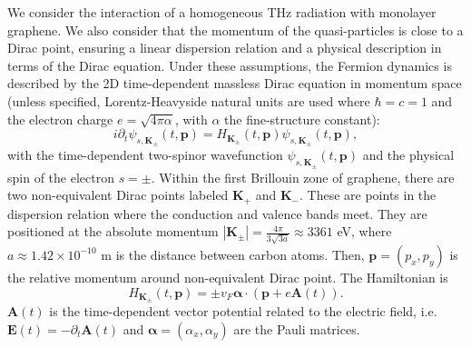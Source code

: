 \documentclass[9pt,twocolumn,twoside]{osajnl}
\begin{document}
We consider the interaction of a homogeneous THz radiation with monolayer graphene. %
We also consider that the momentum of the quasi-particles is close to a Dirac point, ensuring a linear dispersion relation and a physical description in terms of the Dirac equation. 
Under these assumptions, the Fermion dynamics is described by the 2D time-dependent massless Dirac equation in momentum space (unless specified, Lorentz-Heavyside natural units are used where $\hbar=c=1$ and the electron charge $e=\sqrt{4\pi\alpha}$, with $\alpha$ the fine-structure constant): %
\begin{equation}\label{eq_Dirac}
i\partial_t \psi_{s,\textbf{K}_{\pm}}(t,\textbf{p}) = H_{\textbf{K}_{\pm}}  (t,\textbf{p}) \psi_{s,\textbf{K}_{\pm}}(t,\textbf{p}),
\end{equation}
with the time-dependent two-spinor wavefunction  $\psi_{s,\textbf{K}_{\pm}}(t,\textbf{p})$ and the physical spin of the electron $s=\pm$.
  Within the first Brillouin zone of graphene, there are two non-equivalent Dirac points labeled $\textbf{K}_{+}$ and $\textbf{K}_{-}$.  These are points in the dispersion relation where the conduction and valence bands meet. They are positioned at the absolute momentum $|\textbf{K}_{\pm}|=\frac{4\pi}{3\sqrt{3a}}\approx 3361$ eV, where $a\approx 1.42\times10^{-10}$ m is the distance between carbon atoms. Then, 
 $\textbf{p} = (p_{x},p_{y})$ is the relative momentum around non-equivalent Dirac point. 
The Hamiltonian is
\begin{equation}\label{eq_Hamiltonian}
H_{\textbf{K}_{\pm}} (t,\textbf{p}) = \pm v_{F} \boldsymbol{\alpha} \cdot (\textbf{p}+e\textbf{A}(t)).
\end{equation}
$\textbf{A}(t)$ is the time-dependent vector potential related to the electric field, i.e.  $\textbf{E}(t)=-\partial_t \textbf{A}(t)$ and $\boldsymbol{\alpha} = (\alpha_{x},\alpha_{y})$ are the Pauli matrices.
\end{document}
